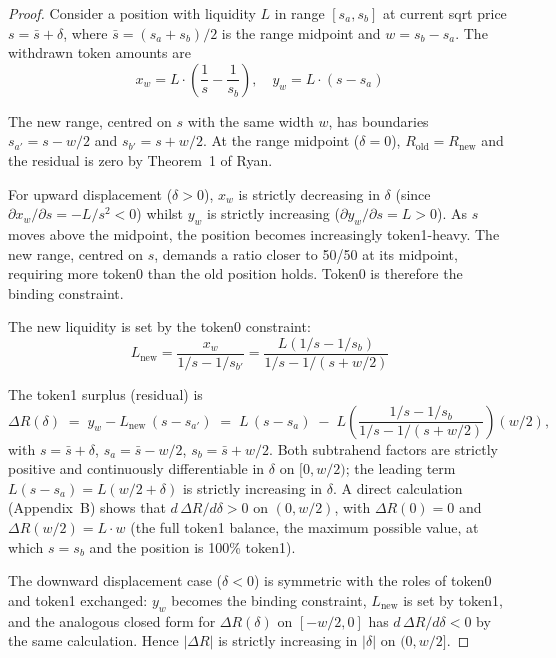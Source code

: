 \documentclass[11pt,a4paper]{article}
\theoremstyle{definition}
\begin{document}
\begin{proof}
Consider a position with liquidity $L$ in range $[s_a, s_b]$ at current sqrt price $s = \bar{s} + \delta$, where $\bar{s} = (s_a + s_b)/2$ is the range midpoint and $w = s_b - s_a$. The withdrawn token amounts are
\begin{equation}
x_w = L \cdot \left(\frac{1}{s} - \frac{1}{s_b}\right), \quad y_w = L \cdot (s - s_a)
\end{equation}

The new range, centred on $s$ with the same width $w$, has boundaries $s_{a'} = s - w/2$ and $s_{b'} = s + w/2$. At the range midpoint ($\delta = 0$), $R_{\text{old}} = R_{\text{new}}$ and the residual is zero by Theorem~1 of Ryan\cite{ryan2026a}.

For upward displacement ($\delta > 0$), $x_w$ is strictly decreasing in $\delta$ (since $\partial x_w / \partial s = -L/s^2 < 0$) whilst $y_w$ is strictly increasing ($\partial y_w / \partial s = L > 0$). As $s$ moves above the midpoint, the position becomes increasingly token1-heavy. The new range, centred on $s$, demands a ratio closer to 50/50 at its midpoint, requiring more token0 than the old position holds. Token0 is therefore the binding constraint.

The new liquidity is set by the token0 constraint:
\begin{equation}
L_{\text{new}} = \frac{x_w}{1/s - 1/s_{b'}} = \frac{L(1/s - 1/s_b)}{1/s - 1/(s + w/2)}
\end{equation}

The token1 surplus (residual) is
\begin{equation}\label{eq:dr-closed-form}
\Delta R(\delta) \;=\; y_w - L_{\text{new}}\,(s - s_{a'}) \;=\; L\,(s - s_a) \;-\; L\!\left(\frac{1/s - 1/s_b}{1/s - 1/(s + w/2)}\right)\!(w/2),
\end{equation}
with $s = \bar{s} + \delta$, $s_a = \bar{s} - w/2$, $s_b = \bar{s} + w/2$. Both subtrahend factors are strictly positive and continuously differentiable in $\delta$ on $[0, w/2)$; the leading term $L(s - s_a) = L(w/2 + \delta)$ is strictly increasing in $\delta$. A direct calculation (Appendix~B) shows that $d\,\Delta R/d\delta > 0$ on $(0, w/2)$, with $\Delta R(0) = 0$ and $\Delta R(w/2) = L \cdot w$ (the full token1 balance, the maximum possible value, at which $s = s_b$ and the position is 100\% token1).

The downward displacement case ($\delta < 0$) is symmetric with the roles of token0 and token1 exchanged: $y_w$ becomes the binding constraint, $L_{\text{new}}$ is set by token1, and the analogous closed form for $\Delta R(\delta)$ on $[-w/2, 0]$ has $d\,\Delta R/d\delta < 0$ by the same calculation. Hence $|\Delta R|$ is strictly increasing in $|\delta|$ on $(0, w/2]$.
\end{proof}
\end{document}
